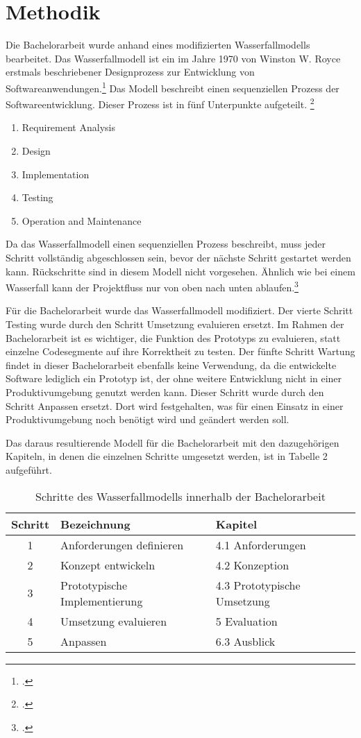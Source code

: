 \section{Methodik}
Die Bachelorarbeit wurde anhand eines modifizierten Wasserfallmodells bearbeitet. Das Wasserfallmodell ist ein im Jahre 1970 von Winston W. Royce erstmals beschriebener Designprozess zur Entwicklung von Softwareanwendungen.\footcite{model2015waterfall} Das Modell beschreibt einen sequenziellen Prozess der Softwareentwicklung. Dieser Prozess ist in fünf Unterpunkte aufgeteilt. \footcite{adenowo2013software}

\begin{enumerate}
\item Requirement Analysis
\item Design
\item Implementation
\item Testing
\item Operation and Maintenance
\end{enumerate}

Da das Wasserfallmodell einen sequenziellen Prozess beschreibt, muss jeder Schritt vollständig abgeschlossen sein, bevor der nächste Schritt gestartet werden kann. Rückschritte sind in diesem Modell nicht vorgesehen. Ähnlich wie bei einem Wasserfall kann der Projektfluss nur von oben nach unten ablaufen.\footcite{PorathRon2020ICuI}

Für die Bachelorarbeit wurde das Wasserfallmodell modifiziert. Der vierte Schritt \glqq Testing\grqq{} wurde durch den Schritt \glqq Umsetzung evaluieren\grqq{} ersetzt. Im Rahmen der Bachelorarbeit ist es wichtiger, die Funktion des Prototyps zu evaluieren, statt einzelne Codesegmente auf ihre Korrektheit zu testen. Der fünfte Schritt \glqq Wartung\grqq{} findet in dieser Bachelorarbeit ebenfalls keine Verwendung, da die entwickelte Software lediglich ein Prototyp ist, der ohne weitere Entwicklung nicht in einer Produktivumgebung genutzt werden kann. Dieser Schritt wurde durch den Schritt \glqq Anpassen\grqq{} ersetzt. Dort wird festgehalten, was für einen Einsatz in einer Produktivumgebung noch benötigt wird und geändert werden soll.

Das daraus resultierende Modell für die Bachelorarbeit mit den dazugehörigen Kapiteln, in denen die einzelnen Schritte umgesetzt werden, ist in Tabelle 2 aufgeführt.

\begin{table}[H]
\centering
\begin{tabular}{c|l|l}
\textbf{Schritt} & \textbf{Bezeichnung} & \textbf{Kapitel}\\
\hline
1 & Anforderungen definieren & 4.1 Anforderungen\\
2 & Konzept entwickeln & 4.2 Konzeption\\
3 & Prototypische Implementierung & 4.3 Prototypische Umsetzung\\
4 & Umsetzung evaluieren & 5 Evaluation\\
5 & Anpassen & 6.3 Ausblick\\
\end{tabular}
\caption{Schritte des Wasserfallmodells innerhalb der Bachelorarbeit}
\end{table}

